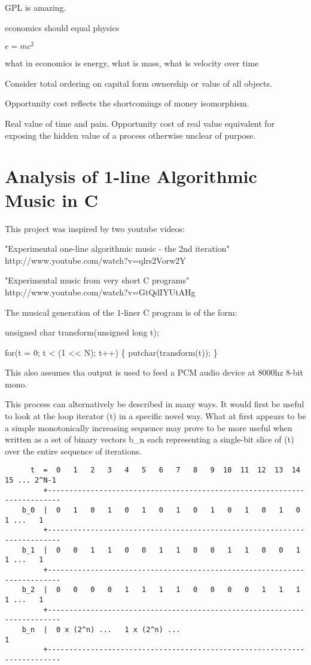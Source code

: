 \documentclass[11pt]{book}
\begin{document}
GPL is amazing.

economics should equal physics

$ e = mc^2 $

what in economics is energy, what is mass, what is velocity over time

Consider total ordering on capital form ownership or value of all objects.

Opportunity cost reflects the shortcomings of money isomorphism.

Real value of time and pain. Opportunity cost of real value equivalent for exposing the hidden value of a process otherwise unclear of purpose.

\chapter{Analysis of 1-line Algorithmic Music in C}

This project was inspired by two youtube videos:

	"Experimental one-line algorithmic music - the 2nd iteration"
	http://www.youtube.com/watch?v=qlrs2Vorw2Y

	"Experimental music from very short C programs"
	http://www.youtube.com/watch?v=GtQdIYUtAHg

The musical generation of the 1-liner C program is of the form:

	unsigned char transform(unsigned long t);

	for(t = 0; t < (1 << N); t++) \{
		putchar(transform(t));
	\}

This also assumes tha output is used to feed a PCM audio device at 8000hz 8-bit mono.

This process can alternatively be described in many ways. It would first be useful to look at the loop iterator (t) in a specific
novel way.  What at first appears to be a simple monotonically increasing sequence may prove to be more useful when written as
a set of binary vectors b\_n each representing a single-bit slice of (t) over the entire sequence of iterations.

\begin{verbatim}
	  t  =  0   1   2   3   4   5   6   7   8   9  10  11  12  13  14  15 ... 2^N-1
	     +-------------------------------------------------------------------------
	b_0  |  0   1   0   1   0   1   0   1   0   1   0   1   0   1   0   1 ...   1
	     +-------------------------------------------------------------------------
	b_1  |  0   0   1   1   0   0   1   1   0   0   1   1   0   0   1   1 ...   1
	     +-------------------------------------------------------------------------
	b_2  |  0   0   0   0   1   1   1   1   0   0   0   0   1   1   1   1 ...   1
	     +-------------------------------------------------------------------------
	b_n  |  0 x (2^n) ...   1 x (2^n) ...                                       1
	     +-------------------------------------------------------------------------
\end{verbatim}
\end{document}
